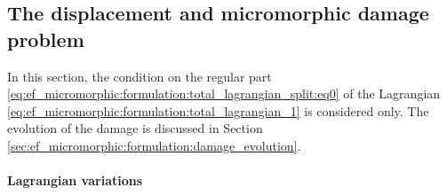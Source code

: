 


\subsection{The displacement and micromorphic damage problem}
\label{sec:ef_micromorphic:lagrangian_regular_part}

In this section, the condition on the regular part \eqref{eq:ef_micromorphic:formulation:total_lagrangian_split:eq0} of
the Lagrangian \eqref{eq:ef_micromorphic:formulation:total_lagrangian_1} is considered only.
The evolution of the damage is discussed in Section
\ref{sec:ef_micromorphic:formulation:damage_evolution}.

\paragraph{Lagrangian variations}

